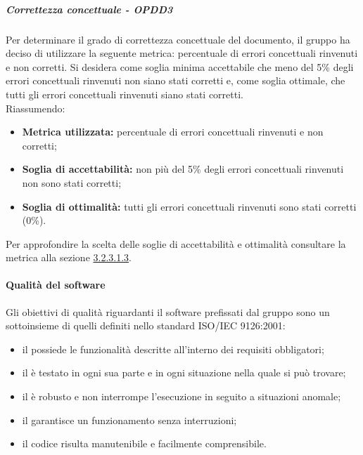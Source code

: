 \documentclass[PianoDiQualifica.tex]{subfiles}
\begin{document}
				\subparagraph{Correttezza concettuale - OPDD3}
				Per determinare il grado di correttezza concettuale del documento, il gruppo ha deciso di utilizzare la seguente metrica: percentuale di errori concettuali rinvenuti e non corretti.
				Si desidera come soglia minima accettabile che meno del 5\% degli errori concettuali rinvenuti non siano stati corretti e, come soglia ottimale, che tutti gli errori
				concettuali rinvenuti siano stati corretti.\\
				Riassumendo:
				\begin{itemize}
				\item \textbf{Metrica utilizzata:} percentuale di errori concettuali rinvenuti e non corretti;
				\item \textbf{Soglia di accettabilità:} non più del 5\% degli errori concettuali rinvenuti non sono stati corretti;
				\item \textbf{Soglia di ottimalità:} tutti gli errori concettuali rinvenuti sono stati corretti (0\%).
				\end{itemize}
				Per approfondire la scelta delle soglie di accettabilità e ottimalità consultare la metrica alla sezione \hyperlink{err_concettuali}{3.2.3.1.3}.

			\paragraph{Qualità del software}
			Gli obiettivi di qualità riguardanti il software prefissati dal gruppo \GRUPPO{} sono un sottoinsieme di quelli definiti nello standard ISO/IEC 9126:2001:
			\begin{itemize}
				\item il  possiede le funzionalità descritte all’interno dei requisiti obbligatori;
				\item il  è testato in ogni sua parte e in ogni situazione nella quale si può trovare;
				\item il  è robusto e non interrompe l’esecuzione in seguito a situazioni anomale;
				\item il  garantisce un funzionamento senza interruzioni;
				\item il codice risulta manutenibile e facilmente comprensibile.
			\end{itemize}
\end{document}
